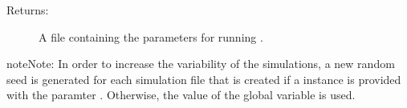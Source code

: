 \documentclass[letterpaper,10pt,english]{sphinxmanual}
\begin{document}
\begin{fulllineitems}
\begin{description}
\item[{Returns:}] \leavevmode
A  file containing the parameters for running .

\end{description}

\begin{sphinxadmonition}{note}{Note:}
In order to increase the variability of the simulations, a new
random seed is generated for each simulation file that is
created if a  instance is provided with
the paramter . Otherwise, the value of the global
variable  is used.
\end{sphinxadmonition}

\end{fulllineitems}

\end{document}
